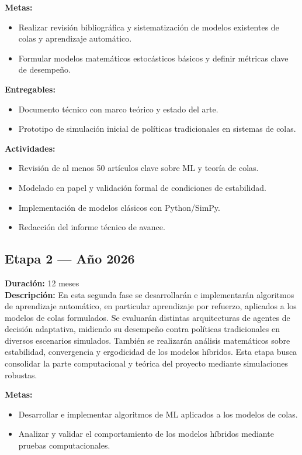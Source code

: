 \documentclass[12pt]{article}
\begin{document}
\textbf{Metas:}
\begin{itemize}
  \item Realizar revisión bibliográfica y sistematización de modelos existentes de colas y aprendizaje automático.
  \item Formular modelos matemáticos estocásticos básicos y definir métricas clave de desempeño.
\end{itemize}

\textbf{Entregables:}
\begin{itemize}
  \item Documento técnico con marco teórico y estado del arte.
  \item Prototipo de simulación inicial de políticas tradicionales en sistemas de colas.
\end{itemize}

\textbf{Actividades:}
\begin{itemize}
  \item Revisión de al menos 50 artículos clave sobre ML y teoría de colas.
  \item Modelado en papel y validación formal de condiciones de estabilidad.
  \item Implementación de modelos clásicos con Python/SimPy.
  \item Redacción del informe técnico de avance.
\end{itemize}

\subsection*{Etapa 2 — Año 2026}
\textbf{Duración:} 12 meses\\
\textbf{Descripción:} En esta segunda fase se desarrollarán e implementarán algoritmos de aprendizaje automático, en particular aprendizaje por refuerzo, aplicados a los modelos de colas formulados. Se evaluarán distintas arquitecturas de agentes de decisión adaptativa, midiendo su desempeño contra políticas tradicionales en diversos escenarios simulados. También se realizarán análisis matemáticos sobre estabilidad, convergencia y ergodicidad de los modelos híbridos. Esta etapa busca consolidar la parte computacional y teórica del proyecto mediante simulaciones robustas.

\textbf{Metas:}
\begin{itemize}
  \item Desarrollar e implementar algoritmos de ML aplicados a los modelos de colas.
  \item Analizar y validar el comportamiento de los modelos híbridos mediante pruebas computacionales.
\end{itemize}
\end{document}
